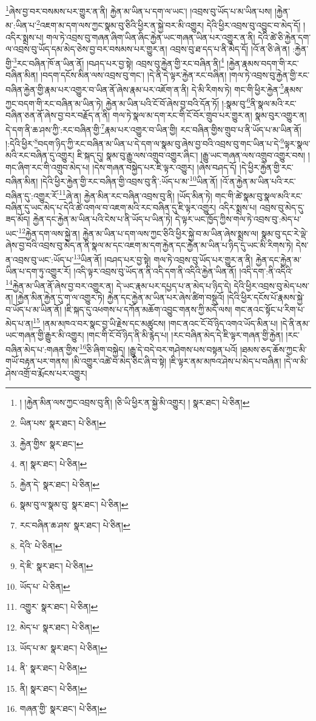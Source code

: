 \footnote{། །རྐྱེན་མིན་ལས་ཀྱང་འབྲས་བུ་ནི། །ཅི་ཡི་ཕྱིར་ན་སྐྱེ་མི་འགྱུར། །  སྣར་ཐང་།  པེ་ཅིན། }ཞེས་བྱ་བར་བསམས་པར་གྱུར་ན་ནི། རྐྱེན་མ་ཡིན་པ་དག་ལ་ཡང་། །འབྲས་བུ་ཡོད་པ་མ་ཡིན་པས། །རྐྱེན་མ་:ཡིན་པ་\footnote{ཡིན་པས་  སྣར་ཐང་།  པེ་ཅིན། }འཇག་མ་དག་ལས་ཀྱང་སྣམ་བུ་ཅིའི་ཕྱིར་ན་སྐྱེ་བར་མི་འགྱུར། དེའི་ཕྱིར་འབྲས་བུ་འབྱུང་བ་མེད་དོ། །འདིར་སྨྲས་པ། གལ་ཏེ་འབྲས་བུ་གཞན་ཞིག་ཡིན་ཞིང་རྐྱེན་ཡང་གཞན་ཡིན་པར་འགྱུར་ན་ནི། དེའི་ཚེ་ཅི་རྐྱེན་དག་ལ་འབྲས་བུ་ཡོད་དམ་མེད་ཅེས་བྱ་བར་བསམས་པར་གྱུར་ན། འབྲས་བུ་ཐ་དད་པ་ནི་མེད་དོ། །འོ་ན་ཅི་ཞེ་ན། :རྐྱེན་གྱི་\footnote{རྐྱེན་གྱིས་  སྣར་ཐང་། }རང་བཞིན་ཁོ་ན་ཡིན་ནོ། །བཤད་པར་བྱ་སྟེ། འབྲས་བུ་རྐྱེན་གྱི་རང་བཞིན་ནི།\footnote{ན།  སྣར་ཐང་།  པེ་ཅིན། } །རྐྱེན་རྣམས་བདག་གི་རང་བཞིན་མིན། །བདག་དངོས་མིན་ལས་འབྲས་བུ་གང་། །དེ་ནི་དེ་ལྟར་རྐྱེན་རང་བཞིན། །གལ་ཏེ་འབྲས་བུ་རྐྱེན་གྱི་རང་བཞིན་རྐྱེན་གྱི་རྣམ་པར་འགྱུར་བ་ཡིན་ནོ་ཞེས་རྣམ་པར་འཇོག་ན་ནི། དེ་མི་རིགས་ཏེ། གང་གི་ཕྱིར་རྐྱེན་\footnote{རྐྱེན་དེ་  སྣར་ཐང་།  པེ་ཅིན། }རྣམས་ཀྱང་བདག་གི་རང་བཞིན་མ་ཡིན་ཏེ། རྐྱེན་མ་ཡིན་པའི་ངོ་བོ་ཞེས་བྱ་བའི་དོན་ཏོ། །:སྣམ་བུ་\footnote{སྣམ་བུ་ལ་སྣམ་བུ་  སྣར་ཐང་།  པེ་ཅིན། }ནི་སྣལ་མའི་རང་བཞིན་ཅན་ནོ་ཞེས་བྱ་བར་བརྗོད་ན་ནི། གལ་ཏེ་སྣལ་མ་དག་རང་གི་ངོ་བོར་གྲུབ་པར་གྱུར་ན། སྣམ་བུར་འགྱུར་ན། དེ་དག་ནི་ཆ་ཤས་ཀྱི་:རང་བཞིན་གྱི་\footnote{རང་བཞིན་ཆ་ཤས་  སྣར་ཐང་།  པེ་ཅིན། }རྣམ་པར་འགྱུར་བ་ཡིན་གྱི། རང་བཞིན་གྱིས་གྲུབ་པ་ནི་ཡོད་པ་མ་ཡིན་ནོ། །:དེའི་ཕྱིར་\footnote{དེའི་  པེ་ཅིན། }བདག་ཉིད་ཀྱི་རང་བཞིན་མ་ཡིན་པ་དེ་དག་ལ་སྣམ་བུ་ཞེས་བྱ་བའི་འབྲས་བུ་གང་ཡིན་པ་དེ་\footnote{དེ་ཇི་  སྣར་ཐང་།  པེ་ཅིན། }ལྟར་སྣལ་མའི་རང་བཞིན་དུ་འགྱུར། ཇི་སྐད་དུ། སྣམ་བུ་རྒྱུ་ལས་འགྲུབ་འགྱུར་ཞིང་། །རྒྱུ་ཡང་གཞན་ལས་འགྲུབ་འགྱུར་བས། །གང་ཞིག་རང་གི་འགྲུབ་མེད་པ། །དེས་གཞན་བསྐྱེད་པར་ཇི་ལྟར་འགྱུར། །ཞེས་བཤད་དོ། །དེ་ཕྱིར་རྐྱེན་གྱི་རང་བཞིན་མིན། །དེའི་ཕྱིར་རྐྱེན་གྱི་རང་བཞིན་གྱི་འབྲས་བུ་ནི་:ཡོད་པ་མ་\footnote{ཡོད་པ་  པེ་ཅིན། }ཡིན་ནོ། །འོ་ན་རྐྱེན་མ་ཡིན་པའི་རང་བཞིན་དུ་:འགྱུར་རོ་\footnote{འགྱུར་  སྣར་ཐང་།  པེ་ཅིན། }ཞེ་ན། རྐྱེན་མིན་རང་བཞིན་འབྲས་བུ་ནི། །ཡོད་མིན་ཏེ། གང་གི་ཚེ་སྣམ་བུ་སྣལ་མའི་རང་བཞིན་དུ་ཡང་མེད་པ་དེའི་ཚེ་འགལ་བ་འཇག་མའི་རང་བཞིན་དུ་ཇི་ལྟར་འགྱུར། འདིར་སྨྲས་པ། འབྲས་བུ་མེད་དུ་ཟད་མོད། རྐྱེན་དང་རྐྱེན་མ་ཡིན་པའི་ངེས་པ་ནི་ཡོད་པ་ཡིན་ཏེ། དེ་ལྟར་ཡང་ཁྱོད་ཀྱིས་གལ་ཏེ་འབྲས་བུ་:མེད་པ་ཡང་\footnote{མེད་པ་  སྣར་ཐང་།  པེ་ཅིན། }རྐྱེན་དག་ལས་སྐྱེ་ན། རྐྱེན་མ་ཡིན་པ་དག་ལས་ཀྱང་ཅིའི་ཕྱིར་སྐྱེ་བ་མ་ཡིན་ཞེས་སྨྲས་ལ། སྣམ་བུ་དང་རེ་ལྡེ་ཞེས་བྱ་བའི་འབྲས་བུ་མེད་ན་ནི་སྣལ་མ་དང་འཇག་མ་དག་རྐྱེན་དང་རྐྱེན་མ་ཡིན་པ་ཉིད་དུ་ཡང་མི་རིགས་ཏེ། དེས་ན་འབྲས་བུ་ཡང་:ཡོད་པ་\footnote{ཡོད་པ་མ་  སྣར་ཐང་།  པེ་ཅིན། }ཡིན་ནོ། །བཤད་པར་བྱ་སྟེ། གལ་ཏེ་འབྲས་བུ་ཡོད་པར་གྱུར་ན་ནི། རྐྱེན་དང་རྐྱེན་མ་ཡིན་པ་དག་ཏུ་འགྱུར་རོ། །འདི་ལྟར་འབྲས་བུ་ཡོད་ན་ནི་འདི་དག་ནི་འདིའི་རྐྱེན་ཡིན་ནོ། །འདི་དག་:ནི་འདིའི་\footnote{ནི་  སྣར་ཐང་།  པེ་ཅིན། }རྐྱེན་མ་ཡིན་ནོ་ཞེས་བྱ་བར་འགྱུར་ན། དེ་ཡང་རྣམ་པར་དཔྱད་པ་ན་མེད་པ་ཉིད་དེ། དེའི་ཕྱིར་འབྲས་བུ་མེད་པས་ན། །རྐྱེན་མིན་རྐྱེན་དུ་ག་ལ་འགྱུར་ཏེ། རྐྱེན་དང་རྐྱེན་མ་ཡིན་པར་ཞེས་ཚིག་བསྡུའོ། །དེའི་ཕྱིར་དངོས་པོ་རྣམས་སྐྱེ་བ་ཡོད་པ་མ་ཡིན་ནོ། །ཇི་སྐད་དུ་འཕགས་པ་དཀོན་མཆོག་འབྱུང་གནས་ཀྱི་མདོ་ལས། གང་ནའང་སྟོང་པ་རིག་པ་མེད་པ་ན།\footnote{ནི།  སྣར་ཐང་།  པེ་ཅིན། } །ནམ་མཁའ་བར་སྣང་བྱ་ཡི་རྗེས་དང་མཚུངས། །གང་ནའང་ངོ་བོ་ཉིད་འགའ་ཡོད་མིན་པ། །དེ་ནི་ནམ་ཡང་གཞན་གྱི་རྒྱུར་མི་འགྱུར། །གང་གི་ངོ་བོ་ཉིད་ནི་མི་རྙེད་པ། །རང་བཞིན་མེད་དེ་ཇི་ལྟར་གཞན་གྱི་རྐྱེན། །རང་བཞིན་མེད་པ་:གཞན་གྱིས་\footnote{གཞན་གྱི་  སྣར་ཐང་།  པེ་ཅིན། }ཅི་ཞིག་བསྐྱེད། །རྒྱུ་དེ་བདེ་བར་གཤེགས་པས་བསྟན་པའོ། །ཐམས་ཅད་ཆོས་ཀྱང་མི་གཡོ་བརྟན་པར་གནས། །མི་འགྱུར་འཚེ་བ་མེད་ཅིང་ཞི་བ་སྟེ། །ཇི་ལྟར་ནམ་མཁའ་ཤེས་པ་མེད་པ་བཞིན། །དེ་ལ་མི་ཤེས་འགྲོ་བ་རྨོངས་པར་འགྱུར། 